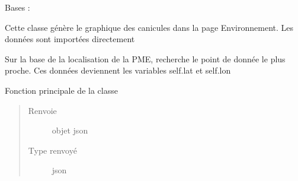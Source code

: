 \documentclass[letterpaper,10pt,french]{sphinxmanual}
\begin{document}

\begin{fulllineitems}
\label{\detokenize{app.home.content_gen:app.home.content_gen.graph_generation.CaniculePlot}}
\sphinxAtStartPar
Bases : 

\sphinxAtStartPar
Cette classe génère le graphique des canicules dans la page Environnement.
Les données sont importées directement

\begin{fulllineitems}
\label{\detokenize{app.home.content_gen:app.home.content_gen.graph_generation.CaniculePlot.find_closest}}
\sphinxAtStartPar
Sur la base de la localisation de la PME, recherche le point de donnée le plus proche.
Ces données deviennent les variables self.lat et self.lon

\end{fulllineitems}


\begin{fulllineitems}
\label{\detokenize{app.home.content_gen:app.home.content_gen.graph_generation.CaniculePlot.main}}
\sphinxAtStartPar
Fonction principale de la classe
\begin{quote}\begin{description}
\item[{Renvoie}] \leavevmode
\sphinxAtStartPar
objet json

\item[{Type renvoyé}] \leavevmode
\sphinxAtStartPar
json

\end{description}\end{quote}

\end{fulllineitems}


\end{fulllineitems}
\end{document}
